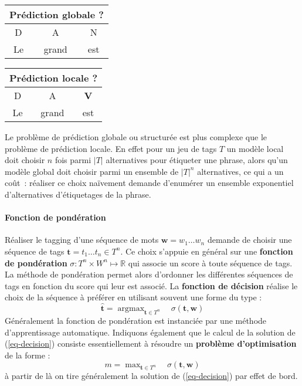 \documentclass[11pt,openany]{book}
\newcommand{\kw}[1]{{\bf #1}} %
\begin{document}
\begin{center}
\begin{tabular}{ccc}\toprule
\multicolumn{3}{c}{Prédiction globale ?}\\\midrule
D & A & N\\
Le & grand & est\\\bottomrule
\end{tabular}
\begin{tabular}{ccc}\toprule
\multicolumn{3}{c}{Prédiction locale ?}\\\midrule
D & A & {\bf\color{red} V}\\
Le & grand & est\\\bottomrule
\end{tabular}
\end{center}

Le problème de prédiction globale ou structurée est plus complexe que le problème de prédiction locale. En effet pour un jeu de tags $T$ un modèle local doit choisir $n$ fois parmi $|T|$ alternatives pour étiqueter une phrase,  alors qu'un modèle global doit choisir parmi un ensemble de $|T|^n$ alternatives, ce qui a un coût~: réaliser ce choix naïvement demande d'enumérer un ensemble  exponentiel d'alternatives d'étiquetages de la phrase.

\paragraph{Fonction de pondération}
Réaliser le tagging d'une séquence de mots $\mathbf{w} =  w_1\ldots w_n$ demande de choisir une séquence de tags $\mathbf{t} = t_1\ldots t_n \in T^n$. 
Ce  choix s'appuie en général sur une \kw{fonction de pondération} $\sigma : T^n\times W^n \mapsto \mathbb{R}$ qui associe un score à toute séquence de tags.
La méthode de pondération permet alors d'ordonner les différentes séquences de tags en fonction du score qui leur est associé.  La \kw{fonction de décision} réalise le choix de la séquence à préférer en utilisant souvent une forme du type :
\begin{equation}
\label{eq-decision}
\hat{\mathbf{t}} = \mathop{\text{argmax}}_{\mathbf{t} \in T^n}\quad \sigma(\mathbf{t},\mathbf{w})
\end{equation}
Généralement la fonction de pondération est instanciée par une méthode d'apprentissage automatique. Indiquons également que le calcul de la solution de (\ref{eq-decision})  consiste essentiellement à résoudre un \kw{problème d'optimisation} de la forme :
\begin{equation}
\label{eq-combi-optim}
m = \mathop{\text{max}}_{\mathbf{t} \in T^n}\quad \sigma(\mathbf{t},\mathbf{w})
\end{equation}
à partir de là on tire généralement la solution de (\ref{eq-decision}) 
par effet de bord.
\end{document}
